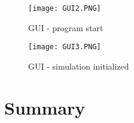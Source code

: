 \documentclass[a4paper, 11pt]{article}
\begin{document}
\begin{figure}[H]
\texttt{[image: GUI2.PNG]} 
\caption{GUI - program start}
\end{figure}
\begin{figure}[H]
\texttt{[image: GUI3.PNG]} 
\caption{GUI - simulation initialized }
\end{figure}
\section{Summary}
%
\printbibliography
\end{document}
